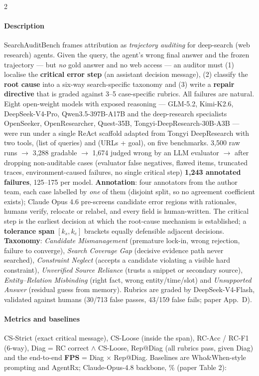 \begin{multicols}{2}
\paragraph{Description} SearchAuditBench frames attribution as \emph{trajectory auditing} for deep-search (web research) agents. Given the query, the agent's wrong final answer and the frozen trajectory --- but \emph{no} gold answer and no web access --- an auditor must (1) localise the \textbf{critical error step} (an assistant decision message), (2) classify the \textbf{root cause} into a six-way search-specific taxonomy and (3) write a \textbf{repair directive} that is graded against 3--5 case-specific rubrics. All failures are natural. Eight open-weight models with exposed reasoning --- GLM-5.2, Kimi-K2.6, DeepSeek-V4-Pro, Qwen3.5-397B-A17B and the deep-research specialists OpenSeeker, OpenResearcher, Quest-35B, Tongyi-DeepResearch-30B-A3B --- were run under a single ReAct scaffold adapted from Tongyi DeepResearch with two tools,  (list of queries) and  (URLs + goal), on five benchmarks. 3,500 raw runs $\to$ 3,288 gradable $\to$ 1,674 judged wrong by an LLM evaluator $\to$ after dropping non-auditable cases (evaluator false negatives, flawed items, truncated traces, environment-caused failures, no single critical step) \textbf{1,243 annotated failures}, 125--175 per model. \textbf{Annotation}: four annotators from the author team, each case labelled by \emph{one} of them (disjoint split, so no agreement coefficient exists); Claude Opus 4.6 pre-screens candidate error regions with rationales, humans verify, relocate or relabel, and every field is human-written. The critical step is the earliest decision at which the root-cause mechanism is established; a \textbf{tolerance span} $[k_s,k_e]$ brackets equally defensible adjacent decisions. \textbf{Taxonomy}: \emph{Candidate Mismanagement} (premature lock-in, wrong rejection, failure to converge), \emph{Search Coverage Gap} (decisive evidence path never searched), \emph{Constraint Neglect} (accepts a candidate violating a visible hard constraint), \emph{Unverified Source Reliance} (trusts a snippet or secondary source), \emph{Entity--Relation Misbinding} (right fact, wrong entity/time/slot) and \emph{Unsupported Answer} (residual guess from memory). Rubrics are graded by DeepSeek-V4-Flash, validated against humans (30/713 false passes, 43/159 false fails; paper App.~D).

\paragraph{Metrics and baselines} CS-Strict (exact critical message), CS-Loose (inside the span), RC-Acc / RC-F1 (6-way), Diag = RC correct $\wedge$ CS-Loose, Rep@Diag (all rubrics pass, given Diag) and the end-to-end \textbf{FPS} = Diag $\times$ Rep@Diag. Baselines are Who\&When-style prompting and AgentRx; Claude-Opus-4.8 backbone, \% (paper Table 2):


\end{multicols}
